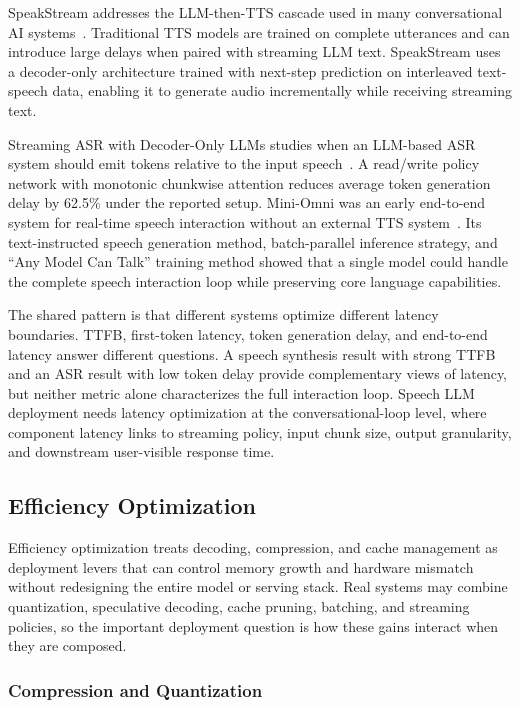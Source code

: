 SpeakStream addresses the LLM-then-TTS cascade used in many conversational AI systems~\citep{bai2025speakstream}. Traditional TTS models are trained on complete utterances and can introduce large delays when paired with streaming LLM text. SpeakStream uses a decoder-only architecture trained with next-step prediction on interleaved text-speech data, enabling it to generate audio incrementally while receiving streaming text.

Streaming ASR with Decoder-Only LLMs studies when an LLM-based ASR system should emit tokens relative to the input speech~\citep{wan2026streamingasr}. A read/write policy network with monotonic chunkwise attention reduces average token generation delay by 62.5\% under the reported setup. Mini-Omni was an early end-to-end system for real-time speech interaction without an external TTS system~\citep{xie2024miniomni}. Its text-instructed speech generation method, batch-parallel inference strategy, and ``Any Model Can Talk'' training method showed that a single model could handle the complete speech interaction loop while preserving core language capabilities.

The shared pattern is that different systems optimize different latency boundaries. TTFB, first-token latency, token generation delay, and end-to-end latency answer different questions. A speech synthesis result with strong TTFB and an ASR result with low token delay provide complementary views of latency, but neither metric alone characterizes the full interaction loop. Speech LLM deployment needs latency optimization at the conversational-loop level, where component latency links to streaming policy, input chunk size, output granularity, and downstream user-visible response time.

\subsection{Efficiency Optimization}

Efficiency optimization treats decoding, compression, and cache management as deployment levers that can control memory growth and hardware mismatch without redesigning the entire model or serving stack. Real systems may combine quantization, speculative decoding, cache pruning, batching, and streaming policies, so the important deployment question is how these gains interact when they are composed.

\subsubsection{Compression and Quantization}

